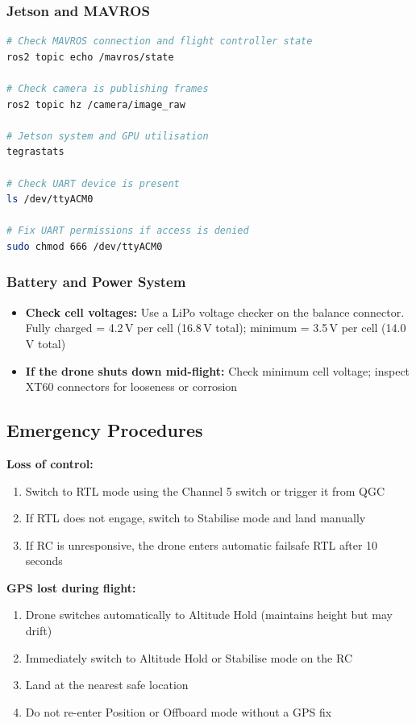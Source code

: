 \documentclass{article}
\begin{document}
\subsubsection{Jetson and MAVROS}

\begin{lstlisting}[language=bash]
# Check MAVROS connection and flight controller state
ros2 topic echo /mavros/state

# Check camera is publishing frames
ros2 topic hz /camera/image_raw

# Jetson system and GPU utilisation
tegrastats

# Check UART device is present
ls /dev/ttyACM0

# Fix UART permissions if access is denied
sudo chmod 666 /dev/ttyACM0
\end{lstlisting}

\subsubsection{Battery and Power System}

\begin{itemize}
    \item \textbf{Check cell voltages:} Use a LiPo voltage checker on the balance connector. Fully charged = 4.2\,V per cell (16.8\,V total); minimum = 3.5\,V per cell (14.0\,V total)
    \item \textbf{If the drone shuts down mid-flight:} Check minimum cell voltage; inspect XT60 connectors for looseness or corrosion
\end{itemize}

\subsection{Emergency Procedures}

\textbf{Loss of control:}
\begin{enumerate}
    \item Switch to RTL mode using the Channel 5 switch or trigger it from QGC
    \item If RTL does not engage, switch to Stabilise mode and land manually
    \item If RC is unresponsive, the drone enters automatic failsafe RTL after 10 seconds
\end{enumerate}

\textbf{GPS lost during flight:}
\begin{enumerate}
    \item Drone switches automatically to Altitude Hold (maintains height but may drift)
    \item Immediately switch to Altitude Hold or Stabilise mode on the RC
    \item Land at the nearest safe location
    \item Do not re-enter Position or Offboard mode without a GPS fix
\end{enumerate}
\end{document}
